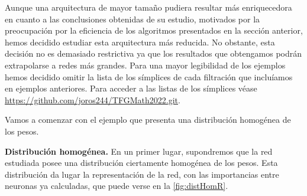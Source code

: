 \documentclass[12pt, a4paper, twoside]{book}
\numberwithin{equation}{section}
\theoremstyle{definition}
\newenvironment{ejem}
  {\pushQED{\qed}\renewcommand{\qedsymbol}{$\blacktriangleleft$}\ejemplo}
  {\popQED\endejemplo}
\theoremstyle{remark}
\theoremstyle{plain}
\begin{document}
	Aunque una arquitectura de mayor tamaño pudiera resultar más 
	enriquecedora en 
	cuanto a las conclusiones obtenidas de su estudio, motivados por la 
	preocupación por la eficiencia de los algoritmos presentados en la 
	sección anterior, hemos decidido estudiar esta arquitectura más 
	reducida. No obstante, esta decisión no es demasiado restrictiva ya 
	que los resultados que obtengamos podrán extrapolarse a redes más 
	grandes. Para una mayor legibilidad de los ejemplos hemos decidido 
	omitir la lista de los símplices de cada filtración que incluíamos en 
	ejemplos anteriores. Para acceder a las listas de los símplices véase 
	\url{https://github.com/joros244/TFGMath2022.git}.

	Vamos a comenzar con el ejemplo que presenta una distribución 
	homogénea de los pesos.

	\begin{ejem}\textbf{Distribución homogénea.}
	En un primer lugar, supondremos que la red estudiada posee una 
	distribución ciertamente homogénea de los pesos. Esta distribución da 
	lugar la representación de la red, con las importancias entre neuronas
	ya calculadas, que puede verse en la \autoref{fig:distHomR}.
	
	\begin{figure}[!htbp]
			\centering
\end{figure}
\end{ejem}
\end{document}
